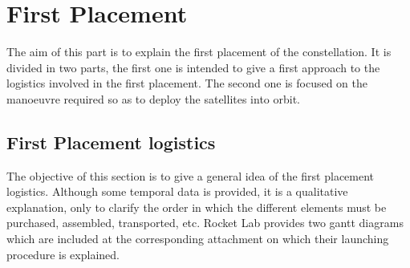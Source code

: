
\section{First Placement}
The aim of this part is to explain the first placement of the constellation. It is divided in two parts, the first one is intended to give a first approach to the logistics involved in the first placement. The second one is focused on the manoeuvre required so as to deploy the satellites into orbit. 
\subsection{First Placement logistics}
The objective of this section is to give a general idea of the first placement logistics. Although some temporal data is provided, it is a qualitative explanation, only to clarify the order in which the different elements must be purchased, assembled, transported, etc. %
Rocket Lab provides two gantt diagrams which are included at the corresponding attachment on which their launching procedure is explained.

%


